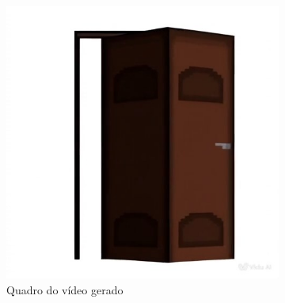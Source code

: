 \begin{figure}[htbp]
\begin{subfigure}{0.35\linewidth}
        \includegraphics[width=1\linewidth]{figs/vidu/framePortaSanfona.jpg}
        \caption{\small Quadro do vídeo gerado}
        \label{fig:vidu15b}
    \end{subfigure}
    \begin{subfigure}{0.35\linewidth}

\end{subfigure}
\end{figure}
